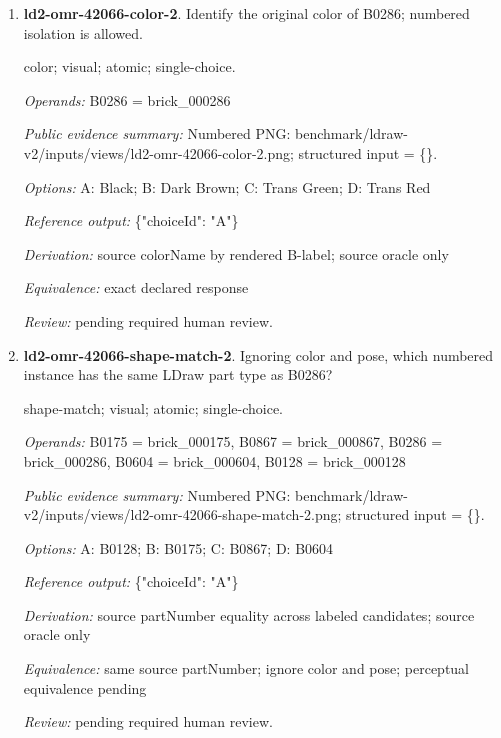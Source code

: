 \begin{enumerate}
\par{\small distance; source-data; atomic; single-choice.\par\textit{Operands:} B1226 = brick\_001226, B1144 = brick\_001144, B0947 = brick\_000947, B0240 = brick\_000240\par\textit{Public evidence summary:} \{"coordinateFrame": "Viewer world, millimeters, Euclidean distance", "centers": \{"B1144": [-47.588, 105.202992, -266.945856], "B1226": [58.8468, 166.972, -189.987204], "B0947": [0, 64.148442, 284.320131], "B0240": [20, 85.6348, 20.876756]\}\}\par\textit{Options:} A: B0240; B: B1226; C: B0947\par\textit{Reference output:} \{"choiceId": "B"\}\par\textit{Derivation:} Euclidean norm from public rounded centers\par\textit{Equivalence:} exact declared response\par\textit{Review:} machine checks passed; no human certification.}
\item \textbf{ld2-omr-42066-color-2}. Identify the original color of B0286; numbered isolation is allowed.
\par{\small color; visual; atomic; single-choice.\par\textit{Operands:} B0286 = brick\_000286\par\textit{Public evidence summary:} Numbered PNG: benchmark/ldraw-v2/inputs/views/ld2-omr-42066-color-2.png; structured input = \{\}.\par\textit{Options:} A: Black; B: Dark Brown; C: Trans Green; D: Trans Red\par\textit{Reference output:} \{"choiceId": "A"\}\par\textit{Derivation:} source colorName by rendered B-label; source oracle only\par\textit{Equivalence:} exact declared response\par\textit{Review:} pending required human review.}
\item \textbf{ld2-omr-42066-shape-match-2}. Ignoring color and pose, which numbered instance has the same LDraw part type as B0286?
\par{\small shape-match; visual; atomic; single-choice.\par\textit{Operands:} B0175 = brick\_000175, B0867 = brick\_000867, B0286 = brick\_000286, B0604 = brick\_000604, B0128 = brick\_000128\par\textit{Public evidence summary:} Numbered PNG: benchmark/ldraw-v2/inputs/views/ld2-omr-42066-shape-match-2.png; structured input = \{\}.\par\textit{Options:} A: B0128; B: B0175; C: B0867; D: B0604\par\textit{Reference output:} \{"choiceId": "A"\}\par\textit{Derivation:} source partNumber equality across labeled candidates; source oracle only\par\textit{Equivalence:} same source partNumber; ignore color and pose; perceptual equivalence pending\par\textit{Review:} pending required human review.}

\end{enumerate}

